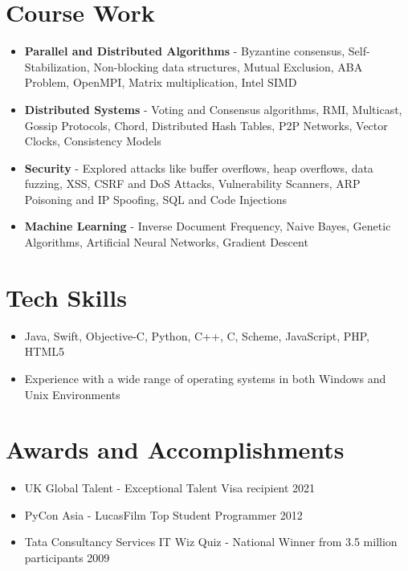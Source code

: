 \documentclass[11pt,a4paper]{moderncv}
\begin{document}
\section{Course Work}
{\begin{itemize}
 \item \textbf{Parallel and Distributed Algorithms} - Byzantine consensus, Self-Stabilization, Non-blocking data structures,
    Mutual Exclusion, ABA Problem, OpenMPI, Matrix multiplication, Intel SIMD
 \item \textbf{Distributed Systems} - Voting and Consensus algorithms, RMI, Multicast, Gossip Protocols, Chord, Distributed Hash Tables, P2P Networks, Vector Clocks, Consistency Models
 \item \textbf{Security} - Explored attacks like buffer overflows,
     heap overflows, data fuzzing, XSS, CSRF and DoS Attacks, Vulnerability Scanners,
     ARP Poisoning and IP Spoofing, SQL and Code Injections
 \item \textbf{Machine Learning} - Inverse Document Frequency, Naive Bayes, Genetic Algorithms, Artificial Neural Networks, Gradient Descent
 \end{itemize}}
\section{Tech Skills}
\begin{itemize}
\item Java, Swift, Objective-C, Python, C++, C, Scheme, JavaScript, PHP, HTML5
\item Experience with a wide range of operating systems in both Windows and Unix Environments
\end{itemize}
\pagebreak
\section{Awards and Accomplishments}
\begin{itemize}
    \item UK Global Talent - Exceptional Talent Visa recipient                                  \hfill 2021
    \item PyCon Asia - LucasFilm Top Student Programmer                                         \hfill 2012
    \item Tata Consultancy Services IT Wiz Quiz - National Winner from 3.5 million participants \hfill 2009
\end{itemize}
\end{document}
